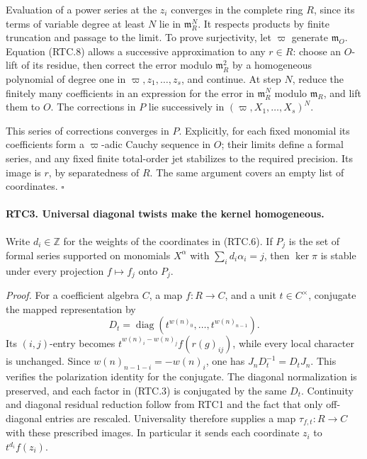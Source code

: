 \documentclass[11pt,a4paper]{article}
\numberwithin{equation}{section}
\theoremstyle{remark}\newtheorem{remark}[theorem]{Remark}
\begin{document}
Evaluation of a power series at the \(z_i\) converges in the
complete ring \(R\), since its terms of variable degree at least
\(N\) lie in \(\mathfrak m_R^N\).  It respects products by
finite truncation and passage to the limit.  To prove surjectivity,
let \(\varpi\) generate \(\mathfrak m_O\).  Equation (RTC.8)
allows a successive approximation to any \(r\in R\): choose an
\(O\)-lift of its residue, then correct the error modulo
\(\mathfrak m_R^2\) by a homogeneous polynomial of degree one
in \(\varpi,z_1,\ldots,z_s\), and continue.  At step \(N\),
reduce the finitely many coefficients in an expression for the error
in \(\mathfrak m_R^N\) modulo \(\mathfrak m_R\), and lift them
to \(O\).  The corrections in \(P\) lie successively in
\((\varpi,X_1,\ldots,X_s)^N\).

This series of corrections converges in \(P\).  Explicitly, for
each fixed monomial its coefficients form a \(\varpi\)-adic
Cauchy sequence in \(O\); their limits define a formal series,
and any fixed finite total-order jet stabilizes to the required
precision.  Its image is \(r\), by separatedness of \(R\).
The same argument covers an empty list of coordinates. \hfill\(\square\)

\paragraph{RTC3. Universal diagonal twists make the kernel homogeneous.}
\label{claim:RTC3}
Write \(d_i\in\mathbb Z\) for the weights of the coordinates in
(RTC.6).  If \(P_j\) is the set of formal series supported on
monomials \(X^\alpha\) with \(\sum_i d_i\alpha_i=j\), then
\(\ker\pi\) is stable under every projection
\(f\mapsto f_j\) onto \(P_j\).

\emph{Proof.}
For a coefficient algebra \(C\), a map \(f:R\to C\), and a
unit \(t\in C^\times\), conjugate the mapped representation by
\[
 D_t=\operatorname{diag}(t^{w(n)_0},\ldots,t^{w(n)_{n-1}}).
\]
Its \((i,j)\)-entry becomes
\(t^{w(n)_i-w(n)_j} f(r(g)_{ij})\), while every local character
is unchanged.  Since \(w(n)_{n-1-i}=-w(n)_i\), one has
\(J_nD_t^{-1}=D_tJ_n\).  This verifies the polarization identity
for the conjugate.  The diagonal normalization is preserved, and
each factor in (RTC.3) is conjugated by the same \(D_t\).
Continuity and diagonal residual reduction follow from RTC1 and the
fact that only off-diagonal entries are rescaled.  Universality
therefore supplies a map \(\tau_{f,t}:R\to C\) with these
prescribed images.  In particular it sends each coordinate \(z_i\)
to \(t^{d_i}f(z_i)\).
\end{document}
